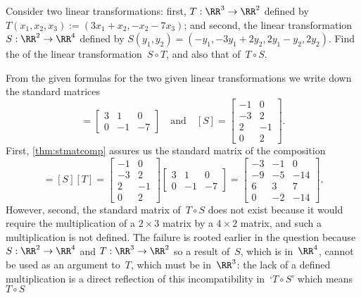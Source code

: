 \begin{example} 
Consider two linear transformations: first, \(T:\RR^3\to\RR^2\) defined by \(T(x_1,x_2,x_3):=(3x_1+x_2,-x_2-7x_3)\); and second, the linear transformation \(S:\RR^2\to\RR^4\) defined by \(S(y_1,y_2)=(-y_1, -3y_1+2y_2, 2y_1-y_2, 2y_2)\).
Find the  of the linear transformation~\(S\circ T\), and also that of~\(T\circ S\).
\begin{solution} 
From the given formulas for the two given linear transformations we write down the standard matrices
\begin{equation*}
[T]=\begin{bmatrix}3&1&0\\0&-1&-7  \end{bmatrix}
\quad\text{and}\quad
[S]=\begin{bmatrix} -1&0\\ -3&2\\2&-1\\0&2 \end{bmatrix}.
\end{equation*}
First, \cref{thm:stmatcomp} assures us the standard matrix of the composition
\begin{equation*}
[S\circ T]
=[S][T]
=\begin{bmatrix} -1&0\\ -3&2\\2&-1\\0&2 \end{bmatrix}
\begin{bmatrix}3&1&0\\0&-1&-7  \end{bmatrix}
=\begin{bmatrix}-3&-1&0
\\-9&-5&-14
\\6&3&7
\\0&-2&-14 \end{bmatrix}.
\end{equation*}
However, second, the standard matrix of~\(T\circ S\) does not exist because it would require the multiplication of a \(2\times3\) matrix by a \(4\times 2\) matrix, and such a multiplication is not defined.
The failure is rooted earlier in the question because \(S:\RR^2\to\RR^4\) and \(T:\RR^3\to\RR^2\) so a result of~\(S\), which is in~\(\RR^4\), cannot be used as an argument to~\(T\), which must be in~\(\RR^3\): the lack of a defined multiplication is a direct reflection of this incompatibility in~`\(T\circ S\)' which means \(T\circ S\) 
\end{solution}
\end{example}




